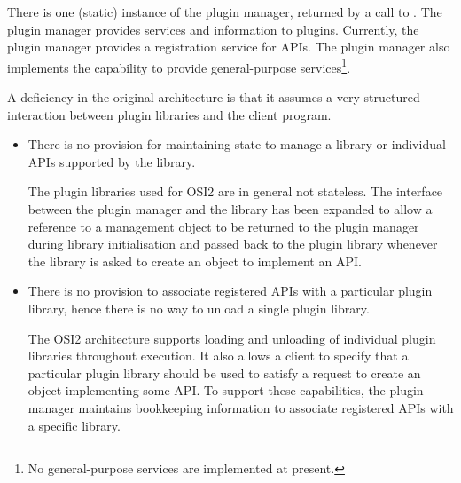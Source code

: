 \documentclass{article}
\newcommand{\OsiTwo}{OSI2\xspace}
\begin{document}
There is one (static) instance of the plugin manager, returned by a call to
.
The plugin manager provides services and information to plugins.
Currently, the plugin manager provides a registration service for APIs.
The plugin manager also implements the capability to provide general-purpose
services\footnote{%
  No general-purpose services are implemented at present.}.

A deficiency in the original architecture is that it assumes a very structured
interaction between plugin libraries and the client program.
\begin{itemize}
  \item
  There is no provision for maintaining state to manage a library or individual
  APIs supported by the library.

  The plugin libraries used for \OsiTwo are in general not stateless.
  The interface between the plugin manager and the library  has been expanded
  to allow a reference to a management object to be returned to the plugin
  manager during library initialisation and passed back to the plugin library
  whenever the library is asked to create an object to implement an API.

  \item
  There is no provision to associate registered APIs with a
  particular plugin library, hence there is no way to unload a single plugin
  library.

  The \OsiTwo architecture supports loading and unloading of individual plugin
  libraries throughout execution.
  It also allows a client to specify that a particular plugin library should
  be used to satisfy a request to create an object implementing some API\@.
  To support these capabilities, the plugin manager maintains
  bookkeeping information to associate registered APIs with a specific library.
\end{itemize}
\end{document}
